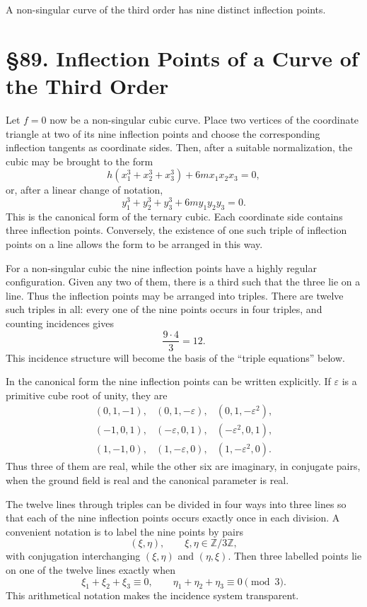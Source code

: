 \documentclass[11pt,a4paper]{book}
\newcommand{\webersection}[2]{\clearpage\section*{\S #1. #2}}
\begin{document}
A non-singular curve of the third order has nine distinct inflection points.

\webersection{89}{Inflection Points of a Curve of the Third Order}

Let \(f=0\) now be a non-singular cubic curve.  Place two vertices of the coordinate triangle at two of its nine inflection points and choose the corresponding inflection tangents as coordinate sides.  Then, after a suitable normalization, the cubic may be brought to the form
\[
h(x_1^3+x_2^3+x_3^3)+6mx_1x_2x_3=0,
\]
or, after a linear change of notation,
\[
y_1^3+y_2^3+y_3^3+6my_1y_2y_3=0.
\]
This is the canonical form of the ternary cubic.  Each coordinate side contains three inflection points.  Conversely, the existence of one such triple of inflection points on a line allows the form to be arranged in this way.

For a non-singular cubic the nine inflection points have a highly regular configuration.  Given any two of them, there is a third such that the three lie on a line.  Thus the inflection points may be arranged into triples.  There are twelve such triples in all: every one of the nine points occurs in four triples, and counting incidences gives
\[
\frac{9\cdot4}{3}=12.
\]
This incidence structure will become the basis of the ``triple equations'' below.

In the canonical form the nine inflection points can be written explicitly.  If \(\varepsilon\) is a primitive cube root of unity, they are
\[
\begin{array}{ccc}
(0,1,-1),&(0,1,-\varepsilon),&(0,1,-\varepsilon^2),\\
(-1,0,1),&(-\varepsilon,0,1),&(-\varepsilon^2,0,1),\\
(1,-1,0),&(1,-\varepsilon,0),&(1,-\varepsilon^2,0).
\end{array}
\]
Thus three of them are real, while the other six are imaginary, in conjugate pairs, when the ground field is real and the canonical parameter is real.

The twelve lines through triples can be divided in four ways into three lines so that each of the nine inflection points occurs exactly once in each division.  A convenient notation is to label the nine points by pairs
\[
(\xi,\eta),\qquad \xi,\eta\in\mathbb Z/3\mathbb Z,
\]
with conjugation interchanging \((\xi,\eta)\) and \((\eta,\xi)\).  Then three labelled points lie on one of the twelve lines exactly when
\[
\xi_1+\xi_2+\xi_3\equiv0,\qquad
\eta_1+\eta_2+\eta_3\equiv0\pmod 3.
\]
This arithmetical notation makes the incidence system transparent.
\end{document}
